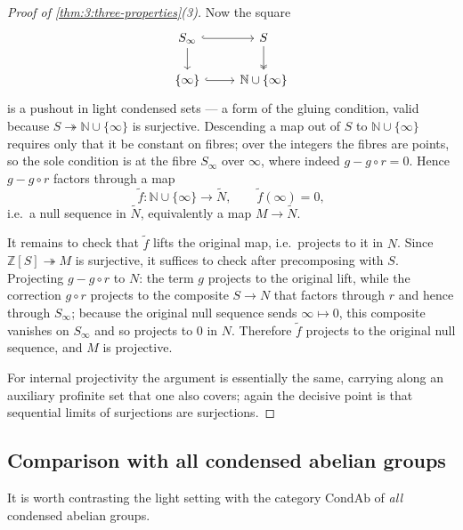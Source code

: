 \begin{proof}[Proof of \cref{thm:3:three-properties}(3)]
Now the square
\begin{equation*}
\begin{tikzcd}
S_\infty \arrow[r, hook] \arrow[d] & S \arrow[d, two heads] \\
\{\infty\} \arrow[r, hook] & \mathbb{N}\cup\{\infty\}
\end{tikzcd}
\end{equation*}
is a pushout in light condensed sets --- a form of the gluing condition, valid
because $S\twoheadrightarrow\mathbb{N}\cup\{\infty\}$ is surjective. Descending a
map out of $S$ to $\mathbb{N}\cup\{\infty\}$ requires only that it be constant on
fibres; over the integers the fibres are points, so the sole condition is at the
fibre $S_\infty$ over $\infty$, where indeed $g-g\circ r=0$. Hence $g-g\circ r$
factors through a map
\begin{equation*}
\widetilde{f}\colon \mathbb{N}\cup\{\infty\}\longrightarrow\widetilde{N},
\qquad \widetilde{f}(\infty)=0,
\end{equation*}
i.e.\ a null sequence in $\widetilde{N}$, equivalently a map $M\to\widetilde{N}$.

It remains to check that $\widetilde{f}$ lifts the original map, i.e.\ projects to
it in $N$. Since $\mathbb{Z}[S]\twoheadrightarrow M$ is surjective, it suffices to
check after precomposing with $S$. Projecting $g-g\circ r$ to $N$: the term $g$
projects to the original lift, while the correction $g\circ r$ projects to the
composite $S\to N$ that factors through $r$ and hence through $S_\infty$; because
the original null sequence sends $\infty\mapsto 0$, this composite vanishes on
$S_\infty$ and so projects to $0$ in $N$. Therefore $\widetilde{f}$ projects to
the original null sequence, and $M$ is projective.

For internal projectivity the argument is essentially the same, carrying along an
auxiliary profinite set that one also covers; again the decisive point is that
sequential limits of surjections are surjections.
\end{proof}

\subsection{Comparison with all condensed abelian groups}

It is worth contrasting the light setting with the category $\mathrm{CondAb}$ of
\emph{all} condensed abelian groups.

